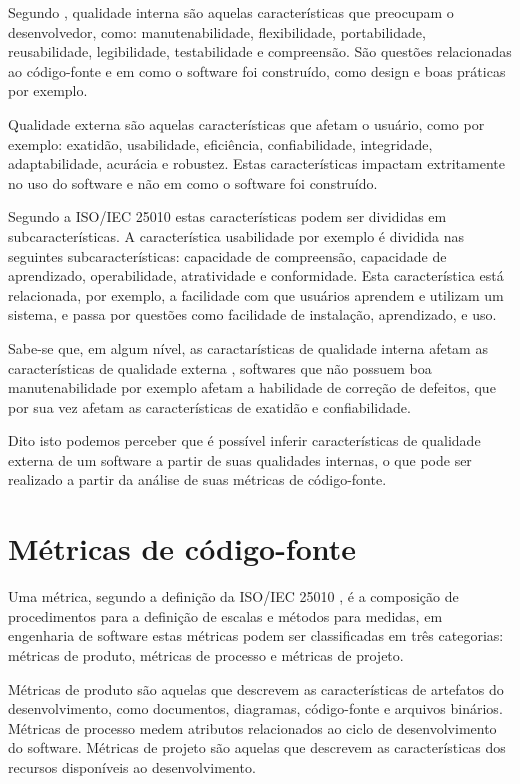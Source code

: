 \documentclass[qual, classic, a4paper]{ufbathesis}
\begin{document}
Segundo , qualidade interna são aquelas
características que preocupam o desenvolvedor, como: manutenabilidade,
flexibilidade, portabilidade, reusabilidade, legibilidade, testabilidade e
compreensão. São questões relacionadas ao código-fonte e em como o software
foi construído, como design e boas práticas por exemplo.

Qualidade externa são aquelas características que afetam o usuário, como por
exemplo: exatidão, usabilidade, eficiência, confiabilidade, integridade,
adaptabilidade, acurácia e robustez. Estas características impactam
extritamente no uso do software e não em como o software foi construído.

Segundo a ISO/IEC 25010 \cite{iso2011iec25010} estas características podem ser
divididas em subcaracterísticas. A característica usabilidade por exemplo é
dividida nas seguintes subcaracterísticas: capacidade de compreensão,
capacidade de aprendizado, operabilidade, atratividade e conformidade. Esta
característica está relacionada, por exemplo, a facilidade com que usuários aprendem e
utilizam um sistema, e passa por questões como facilidade de instalação,
aprendizado, e uso.

Sabe-se que, em algum nível, as caractarísticas de qualidade interna afetam as
características de qualidade externa \cite{McConnell2004}, softwares que não
possuem boa manutenabilidade por exemplo afetam a habilidade de correção de
defeitos, que por sua vez afetam as características de exatidão e
confiabilidade.

Dito isto podemos perceber que é possível inferir características de qualidade
externa de um software a partir de suas qualidades internas, o que pode ser
realizado a partir da análise de suas métricas de código-fonte.

\section{Métricas de código-fonte}

Uma métrica, segundo a definição da ISO/IEC 25010 \cite{iso2011iec25010}, é a
composição de procedimentos para a definição de escalas e métodos para
medidas, em engenharia de software estas métricas podem ser classificadas em três categorias: métricas de
produto, métricas de processo e métricas de projeto.

Métricas de produto são aquelas que
descrevem as características de artefatos do desenvolvimento, como documentos,
diagramas, código-fonte e arquivos binários. Métricas de processo medem atributos relacionados
ao ciclo de desenvolvimento do software. Métricas de projeto são aquelas
que descrevem as características dos recursos disponíveis ao desenvolvimento.
\end{document}
